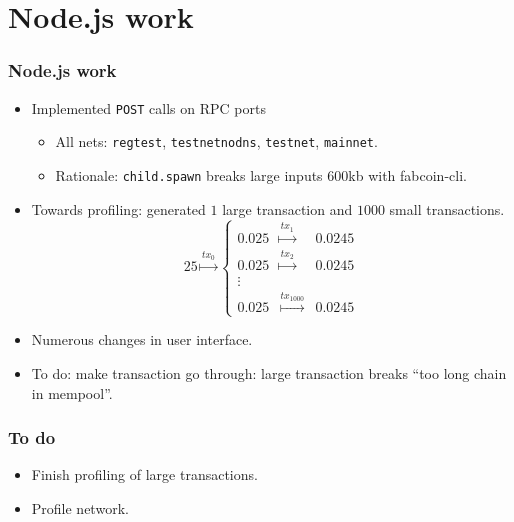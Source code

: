 \section{Node.js work}
\begin{frame}[fragile]
\frametitle{Node.js work}
\begin{itemize}
\item Implemented \verb|POST| calls on RPC ports
\begin{itemize}
\item All nets: \verb|regtest|, \verb|testnetnodns|, \verb|testnet|, \verb|mainnet|. 
\item Rationale: \verb|child.spawn| breaks large inputs $600$kb with fabcoin-cli.
\end{itemize}
\item Towards profiling: generated $1$ large transaction and $1000$ small transactions.
\[
25 \stackrel{tx_0}{\mapsto} \left\{\begin{array}{lcl}
0.025 & \stackrel{tx_1}{\mapsto}& 0.0245 \\
0.025 & \stackrel{tx_2}{\mapsto}& 0.0245\\
\vdots\\
0.025 & \stackrel{tx_{1000}}{\mapsto}& 0.0245
\end{array} \right.
\]
\item Numerous changes in user interface.
\item To do: make transaction go through: large transaction breaks ``too long chain in mempool''.
\end{itemize}

\end{frame}

\begin{frame}
\frametitle{To do}
\begin{itemize}
\item Finish profiling of large transactions.
\item Profile network.

\end{itemize}
\end{frame}